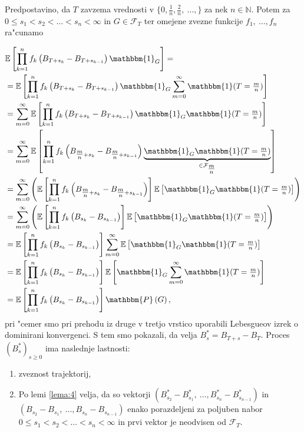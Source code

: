 \documentclass[twoside,11pt]{article}
\begin{document}
\begin{dokaz}
    Predpostavino, da $T$ zavzema vrednosti v $\{0, \tfrac{1}{n}, \tfrac{2}{n}, \ \ldots, \}$ za nek $n\in\mathbb{N}$. 
    Potem za $0 \leq s_1 < s_2 < \ldots < s_n < \infty$ in $G \in \mathcal{F}_T$ ter omejene zvezne funkcije $f_1, \ \ldots, f_n$ ra"cunamo

    \begin{align*}
        & \mathbb{E}\left[\prod_{k=1}^nf_k\left(B_{T+s_k} - B_{T + s_{k-1}}\right)\mathbbm{1}_G\right] = \\
        &=\mathbb{E}\left[\prod_{k=1}^nf_k\left(B_{T+s_k} - B_{T + s_{k-1}}\right)\mathbbm{1}_G\sum_{m=0}^\infty\mathbbm{1}(T=\tfrac{m}{n})\right] \\
        &=\sum_{m=0}^\infty\mathbb{E}\left[\prod_{k=1}^nf_k\left(B_{T+s_k} - B_{T + s_{k-1}}\right)\mathbbm{1}_G\mathbbm{1}(T = \tfrac{m}{n})\right]  \\
        &=\sum_{m=0}^\infty\mathbb{E}\left[\prod_{k=1}^nf_k\left(B_{\tfrac{m}{n}+s_k} - B_{\tfrac{m}{n} + s_{k-1}}\right)\underbrace{\mathbbm{1}_G\mathbbm{1}(T = \tfrac{m}{n})}_{\in \mathcal{F}_{\tfrac{m}{n}}}\right]  \\
        &= \sum_{m=0}^\infty\left(\mathbb{E}\left[\prod_{k=1}^nf_k\left(B_{\tfrac{m}{n}+s_k} - B_{\tfrac{m}{n} + s_{k-1}}\right)\right]\mathbb{E}\left[\mathbbm{1}_G\mathbbm{1}(T = \tfrac{m}{n})\right]\right)  \\
        &= \sum_{m=0}^\infty\left(\mathbb{E}\left[\prod_{k=1}^nf_k\left(B_{s_k} - B_{s_{k-1}}\right)\right]\mathbb{E}\left[\mathbbm{1}_G\mathbbm{1}(T = \tfrac{m}{n})\right]\right)  \\
        &= \mathbb{E}\left[\prod_{k=1}^nf_k\left(B_{s_k} - B_{s_{k-1}}\right)\right]\sum_{m=0}^\infty\mathbb{E}\left[\mathbbm{1}_G\mathbbm{1}(T=\tfrac{m}{n})\right]  \\
        &= \mathbb{E}\left[\prod_{k=1}^nf_k\left(B_{s_k} - B_{s_{k-1}}\right)\right]\mathbb{E}\left[\mathbbm{1}_G\sum_{m=0}^\infty\mathbbm{1}(T=\tfrac{m}{n})\right]  \\
        &= \mathbb{E}\left[\prod_{k=1}^nf_k\left(B_{s_k} - B_{s_{k-1}}\right)\right]\mathbbm{P}\left(G\right), \\
    \end{align*} 
    pri "cemer smo pri prehodu iz druge v tretjo vrstico uporabili Lebesgueov izrek o dominirani 
    konvergenci. S tem smo pokazali, da velja $B^*_s = B_{T+s} - B_T$. Proces $(B^*_s)_{s\geq0}$ ima naslednje lastnosti:
    \begin{enumerate}
        \item zveznost trajektorij,
        \item Po lemi \ref{lema:4} velja, da so vektorji $(B^*_{s_2} - B^*_{s_1}, \ \ldots, B^*_{s_n} - B^*_{s_{n-1}})$ in $(B_{s_2} - B_{s_1}, \ \ldots, B_{s_n} - B_{s_{n-1}})$ enako porazdeljeni za poljuben nabor $0 \leq s_1 < s_2 < \ldots < s_n < \infty$ in prvi vektor je neodvisen od $\mathcal{F}_T$.


\end{enumerate}
\end{dokaz}
\end{document}
